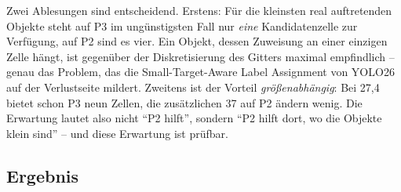 Zwei Ablesungen sind entscheidend. Erstens: Für die kleinsten real auftretenden
Objekte steht auf P3 im ungünstigsten Fall nur \emph{eine} Kandidatenzelle zur
Verfügung, auf P2 sind es vier. Ein Objekt, dessen Zuweisung an einer einzigen
Zelle hängt, ist gegenüber der Diskretisierung des Gitters maximal empfindlich --
genau das Problem, das die Small-Target-Aware Label Assignment von YOLO26 auf der
Verlustseite mildert. Zweitens ist der Vorteil \emph{größenabhängig}: Bei
27,4\px{} bietet schon P3 neun Zellen, die zusätzlichen 37 auf P2 ändern wenig.
Die Erwartung lautet also nicht \enquote{P2 hilft}, sondern \enquote{P2 hilft
dort, wo die Objekte klein sind} -- und diese Erwartung ist prüfbar.

\subsection{Ergebnis}

\begin{table}[htbp]
\centering
\caption[Ergebnis des P2-Vergleichs]{Ergebnis des P2-Vergleichs. Oben nativer
Maßstab, unten bei der je Modell nach \mAPall{} auf  gewählten
Auflösung (: 1600, : 1920);  blieb an
der Auswahl unbeteiligt. Fett ist je Spalte der bessere Wert -- die beiden
Modelle werden von der Zielgröße \emph{Zählfehler} und von \mAPfifty{}
\textbf{gegenläufig} geordnet (Abschnitt~\ref{sec:p2zaehlung}).}
\label{tab:p2ergebnis}
\footnotesize
{}
\end{table}

